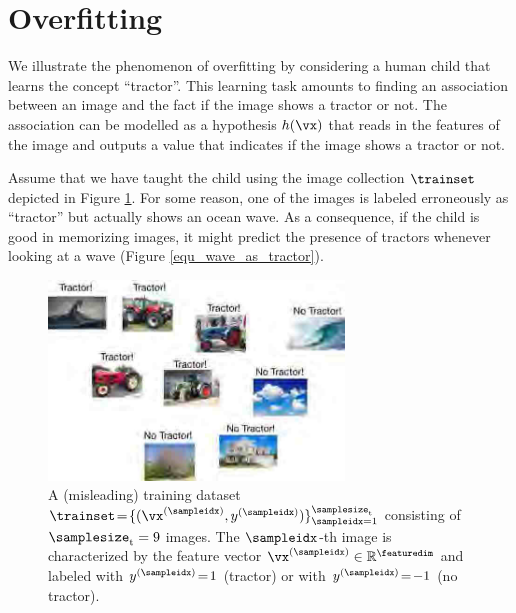 \documentclass[12pt]{report}
\begin{document}



\section{Overfitting}
\label{sec_overfitting_sec_6}

We illustrate the phenomenon of overfitting by considering 
a human child that learns the concept ``tractor''. This 
learning task amounts to finding an association between 
an image and the fact if the image shows a tractor or not. 
The association can be modelled as a hypothesis $h(\vx)$ 
that reads in the features of the image and outputs a value 
that indicates if the image shows a tractor or not. 

Assume that we have taught the child using the image collection 
$\trainset$ depicted in Figure \ref{fig_misleading_data_set}. For some 
reason, one of the images is labeled erroneously as ``tractor'' 
but actually shows an ocean wave. As a consequence, if the child is 
good in memorizing images, it might predict the presence of tractors 
whenever looking at a wave (Figure \ref{equ_wave_as_tractor}). 

\begin{figure}[htbp]
	\centering
	\includegraphics[width=0.7\textwidth]{LabeledDataTractorOverfitting1.jpg}  
	\caption{A (misleading) training dataset $\trainset \!=\! \{ (\vx^{(\sampleidx)},y^{(\sampleidx)}) \}_{\sampleidx=1}^{\samplesize_{\rm t}}$ 
		consisting of $\samplesize_{\rm t}=9$ images. The $\sampleidx$-th image is characterized by the feature vector $\vx^{(\sampleidx)} \in \mathbb{R}^{\featuredim}$ and labeled with $y^{(\sampleidx)}\!=\!1$ 
		(tractor) or with $y^{(\sampleidx)}\!=\!-1$ (no tractor).}
	\label{fig_misleading_data_set}
\end{figure}
\end{document}
